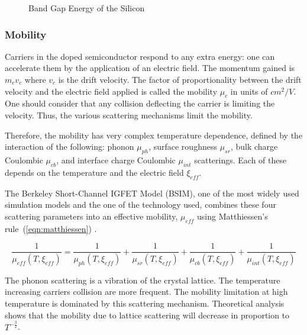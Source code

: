 \begin{figure}[!ht]
	\centering
	
	\caption{Band Gap Energy of the Silicon }
	\label{fig:bandgap}
\end{figure}

\subsubsection{Mobility}               %
\label{sec:mobility}
Carriers in the doped semiconductor respond to any extra energy: one can accelerate them by the application of an electric field. The momentum gained is \(m_c v_c \) where \(v_c \) is the drift velocity. The factor of proportionality between the drift velocity and the electric field applied is called the mobility \(\mu_c \) in units of \(cm^2/V \). One should consider that any collision deflecting the carrier is limiting the velocity. Thus, the various scattering mechanisms limit the mobility.

Therefore, the mobility has very complex temperature dependence, defined by the interaction of the following: phonon \(\mu_{ph} \), surface roughness \(\mu_{sr} \), bulk charge Coulombic \(\mu_{cb} \), and interface charge Coulombic  \(\mu_{int} \) scatterings. Each of these depends on the temperature and the electric field \(\xi_{eff} \).

The Berkeley Short-Channel IGFET Model (BSIM), one of the most widely used simulation models and the one of the technology used, combines these four scattering parameters into an effective mobility, \( \mu_{eff} \) using Matthiessen’s rule~(\ref{eqn:matthiessen}) \cite{Chain1997}.

\begin{equation}
\label{eqn:matthiessen}
\frac{1}{\mu_{eff}(T, \xi_{eff})} = \frac{1}{\mu_{ph}(T, \xi_{eff})} +
\frac{1}{\mu_{sr}(T, \xi_{eff})} + \frac{1}{\mu_{cb}(T, \xi_{eff})} + 
\frac{1}{\mu_{int}(T, \xi_{eff})}
\end{equation}

The phonon scattering is a vibration of the crystal lattice. The temperature increasing carriers collision are more frequent. The mobility limitation at high temperature is dominated by this scattering mechanism. Theoretical analysis shows that the mobility due to lattice scattering will decrease in proportion to \(T^{-\frac{3}{2}} \).

